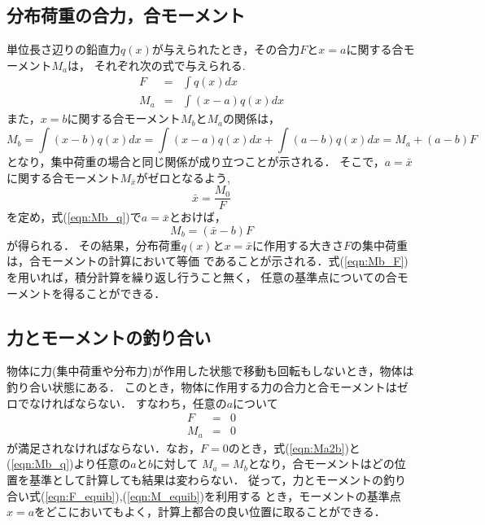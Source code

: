 \documentclass[10pt,a4j]{jbook}
\begin{document}
\subsection{分布荷重の合力，合モーメント}
単位長さ辺りの鉛直力$q(x)$が与えられたとき，その合力$F$と$x=a$に関する合モーメント$M_a$は，
それぞれ次の式で与えられる.
\begin{eqnarray}
	F &= & \int q(x) dx 
	\label{eqn:Ftot_q}
	\\
	M_a &= & \int (x-a)q(x) dx 
	\label{eqn:Mtot_q}
\end{eqnarray}
また，$x=b$に関する合モーメント$M_b$と$M_a$の関係は，
\begin{equation}
	M_b = \int (x-b)q(x)dx = \int (x-a)q(x) dx + \int (a-b)q(x)dx = M_a+(a-b) F
	\label{eqn:Mb_q}
\end{equation}
となり，集中荷重の場合と同じ関係が成り立つことが示される．
そこで，$a=\bar x$に関する合モーメント$M_{\bar x}$がゼロとなるよう,
\begin{equation}
	\bar x = \frac{M_0}{F}
\end{equation}
を定め，式(\ref{eqn:Mb_q})で$a=\bar x$とおけば，
\begin{equation}
	M_b=\left(\bar x - b\right)F
	\label{eqn:Mb_F}
\end{equation}
が得られる．
その結果，分布荷重$q(x)$と$x=\bar x$に作用する大きさ$F$の集中荷重は，合モーメントの計算において等価
であることが示される．式(\ref{eqn:Mb_F})を用いれば，積分計算を繰り返し行うこと無く，
任意の基準点についての合モーメントを得ることができる．
\subsection{力とモーメントの釣り合い}
物体に力(集中荷重や分布力)が作用した状態で移動も回転もしないとき，物体は釣り合い状態にある．
このとき，物体に作用する力の合力と合モーメントはゼロでなければならない．
すなわち，任意の$a$について
\begin{eqnarray}
	F &= &  0 
	\label{eqn:F_equib}
	\\
	M_a &= &  
	0 
	\label{eqn:M_equib}
\end{eqnarray}
が満足されなければならない．なお，$F=0$のとき，式(\ref{eqn:Ma2b})と(\ref{eqn:Mb_q})より任意の$a$と$b$に対して
$M_a=M_b$となり，合モーメントはどの位置を基準として計算しても結果は変わらない．
従って，力とモーメントの釣り合い式(\ref{eqn:F_equib}),(\ref{eqn:M_equib})を利用する
とき，モーメントの基準点$x=a$をどこにおいてもよく，計算上都合の良い位置に取ることができる．
\end{document}
